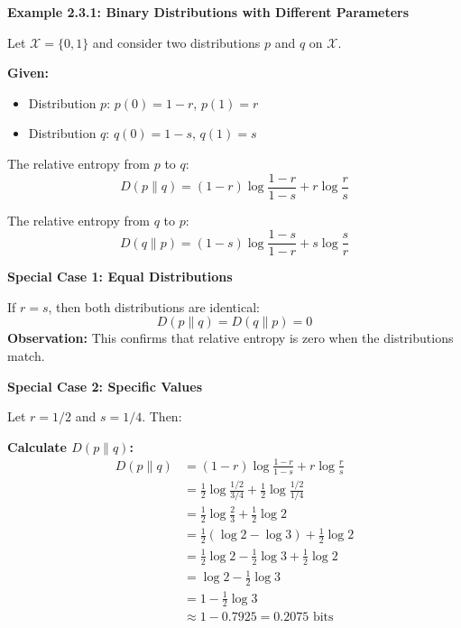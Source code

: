 \documentclass[11pt,a4paper]{book}
\newenvironment{formulabox}[1][Formula]{
    \begin{tcolorbox}[
        enhanced,
        breakable,
        colback=softcoral!10,
        colframe=softcoral!200,
        title=#1,
        fonttitle=\bfseries,
        coltitle=white,
        sharp corners,
        boxrule=1pt,
        left=8pt,
        right=8pt,
        top=6pt,
        bottom=6pt
    ]
}{
    \end{tcolorbox}
}
\newcounter{qna}[chapter]
\renewcommand{\theqna}{\thechapter.\arabic{qna}}
\newenvironment{questionanswerbox}{
    \refstepcounter{qna}%
    \begin{tcolorbox}[
        enhanced,
        breakable,
        colback=softlavender!10,
        colframe=softlavender!200,
        title={Example~\theqna}, %
        fonttitle=\bfseries,
        coltitle=white,
        colbacktitle=softlavender!200,
        sharp corners,
        boxrule=1pt,
        left=8pt,
        right=8pt,
        top=6pt,
        bottom=6pt
    ]
}{
    \end{tcolorbox}
}
\begin{document}
\begin{questionanswerbox}
    \textbf{Example 2.3.1: Binary Distributions with Different Parameters}
    
    Let \(\mathcal{X} = \{0, 1\}\) and consider two distributions \(p\) and \(q\) on \(\mathcal{X}\).
    
    \textbf{Given:}
    \begin{itemize}
        \item Distribution \(p\): \(p(0) = 1-r\), \(p(1) = r\)
        \item Distribution \(q\): \(q(0) = 1-s\), \(q(1) = s\)
    \end{itemize}

    \begin{formulabox}[General Formulas]
    
    The relative entropy from \(p\) to \(q\):
    \[
    D(p \| q) = (1-r) \log \frac{1-r}{1-s} + r \log \frac{r}{s}
    \]
    
    The relative entropy from \(q\) to \(p\):
    \[
    D(q \| p) = (1-s) \log \frac{1-s}{1-r} + s \log \frac{s}{r}
    \]
    \end{formulabox}
    
    \hrulefill
    
    \textbf{Special Case 1: Equal Distributions}
    
    If \(r = s\), then both distributions are identical:
    \[
    D(p \| q) = D(q \| p) = 0
    \]
    \textbf{Observation:} This confirms that relative entropy is zero when the distributions match.
    
    \hrulefill
    
    \textbf{Special Case 2: Specific Values}
    
    Let \(r = 1/2\) and \(s = 1/4\). Then:
    
    \textbf{Calculate \(D(p \| q)\):}
    \begin{align*}
    D(p \| q) &= (1-r) \log \frac{1-r}{1-s} + r \log \frac{r}{s} \\
    &= \frac{1}{2} \log \frac{1/2}{3/4} + \frac{1}{2} \log \frac{1/2}{1/4} \\
    &= \frac{1}{2} \log \frac{2}{3} + \frac{1}{2} \log 2 \\
    &= \frac{1}{2} \left(\log 2 - \log 3\right) + \frac{1}{2} \log 2 \\
    &= \frac{1}{2} \log 2 - \frac{1}{2} \log 3 + \frac{1}{2} \log 2 \\
    &= \log 2 - \frac{1}{2} \log 3 \\
    &= 1 - \frac{1}{2} \log 3 \\
    &\approx 1 - 0.7925 = 0.2075 \text{ bits}
    \end{align*}
    

\end{questionanswerbox}
\end{document}
